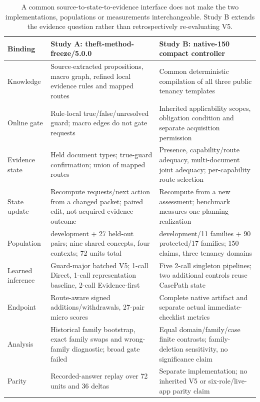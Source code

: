 \begin{table}[t]
\centering\small
\setlength{\tabcolsep}{4pt}
\renewcommand{\arraystretch}{1.09}
\begin{tabularx}{\textwidth}{@{}>{\raggedright\arraybackslash}p{}>{\raggedright\arraybackslash}X>{\raggedright\arraybackslash}X@{}}
\toprule
Binding & Study A: theft-method-freeze/5.0.0 & Study B: native-150 compact controller \\
\midrule
Knowledge & Source-extracted propositions, macro graph, refined local evidence rules and mapped routes & Common deterministic compilation of all three public tenancy templates \\
Online gate & Rule-local true/false/unresolved guard; macro edges do not gate requests & Inherited applicability scopes, obligation condition and separate acquisition permission \\
Evidence state & Held document types; true-guard confirmation; union of mapped routes & Presence, capability/route adequacy, multi-document joint adequacy; per-capability route selection \\
State update & Recompute requests/next action from a changed packet; paired edit, not acquired evidence outcome & Recompute from a new assessment; benchmark measures one planning realization \\
Population & 9 development + 27 held-out pairs; nine shared concepts, four contexts; 72 units total & 60 development/11 families + 90 protected/17 families; 150 claims, three tenancy domains \\
Learned inference & Guard-major batched V5; 1-call Direct, 1-call representation baseline, 2-call Evidence-first & Five 2-call singleton pipelines; two additional controls reuse CasePath state \\
Endpoint & Route-aware signed additions/withdrawals, 27-pair micro scores & Complete native artifact and separate actual immediate-checklist metrics \\
Analysis & Historical family bootstrap, exact family swaps and wrong-family diagnostic; broad gate failed & Equal domain/family/case finite contrasts; family-deletion sensitivity, no significance claim \\
Parity & Recorded-answer replay over 72 units and 36 deltas & Separate implementation; no inherited V5 or six-role/live-app parity claim \\
\bottomrule
\end{tabularx}
\caption{A common source-to-state-to-evidence interface does not make the two
implementations, populations or measurements interchangeable. Study B extends
the evidence question rather than retrospectively re-evaluating V5.}
\label{tab:full-correspondence}
\end{table}

